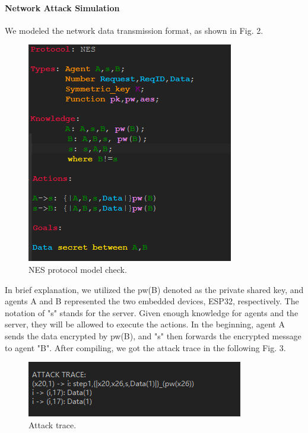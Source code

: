\documentclass[conference]{IEEEtran}
\begin{document}
\paragraph{Network Attack Simulation}
We modeled the network data transmission format, as shown in Fig. 2.
\begin{figure}[h]
	\hspace*{0.4cm}
	\includegraphics[width=0.8\linewidth]{assets/ofmc_protocol.png}
	\vspace{-0.2cm}
	\caption{NES protocol model check.}
	\label{fig:architecture}
\end{figure}  
\newline
In brief explanation, we utilized the pw(B) denoted as the private shared key, and agents A and B represented the two embedded devices, ESP32, respectively. The notation of "s" stands for the server. Given enough knowledge for agents and the server, they will be allowed to execute the actions. In the beginning, agent A sends the data encrypted by pw(B), and "s" then forwards the encrypted message to agent "B". After compiling, we got the attack trace in the following Fig. 3.\\ 
\begin{figure}[h]
	\hspace*{0.4cm}
	\includegraphics[width=0.8\linewidth]{assets/attack trace.png}
	\vspace{-0.2cm}
	\caption{Attack trace.}
	\label{fig:architecture}
\end{figure}
\end{document}
